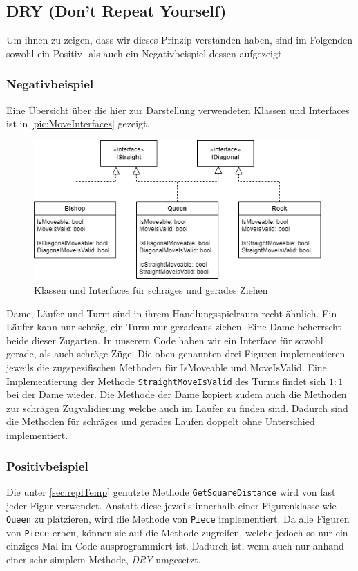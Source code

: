 \documentclass[
10pt, %
a4paper, %
oneside, %
headinclude,footinclude, %
BCOR5mm, %
]{scrartcl}
\begin{document}
\begin{onehalfspace}
\subsection{DRY (Don't Repeat Yourself)}
Um ihnen zu zeigen, dass wir dieses Prinzip verstanden haben, sind im Folgenden sowohl ein Positiv- als auch ein Negativbeispiel dessen aufgezeigt. 

\subsubsection{Negativbeispiel}
Eine Übersicht über die hier zur Darstellung verwendeten Klassen und Interfaces ist in \autoref{pic:MoveInterfaces} gezeigt.

\begin{figure}[h]
	\begin{center}
		\includegraphics[width=11cm]{MoveInterfaces.png}
		\caption{\label{pic:MoveInterfaces}Klassen und Interfaces für schräges und gerades Ziehen}
	\end{center}
\end{figure}

Dame, Läufer und Turm sind in ihrem Handlungsspielraum recht ähnlich. Ein Läufer kann nur schräg, ein Turm nur geradeaus ziehen. Eine Dame beherrscht beide dieser Zugarten. In unserem Code haben wir ein Interface für sowohl gerade, als auch schräge Züge. Die oben genannten drei Figuren implementieren jeweils die zugspezifischen Methoden für IsMoveable und MoveIsValid. 
Eine Implementierung der Methode \texttt{StraightMoveIsValid} des Turms findet sich $1:1$ bei der Dame wieder. Die Methode der Dame kopiert zudem auch die Methoden zur schrägen Zugvalidierung welche auch im Läufer zu finden sind. Dadurch sind die Methoden für schräges und gerades Laufen doppelt ohne Unterschied implementiert.

\subsubsection{Positivbeispiel}
Die unter \autoref{sec:replTemp} genutzte Methode \texttt{GetSquareDistance} wird von fast jeder Figur verwendet. Anstatt diese jeweils innerhalb einer Figurenklasse wie \texttt{Queen} zu platzieren, wird die Methode von \texttt{Piece} implementiert. Da alle Figuren von \texttt{Piece} erben, können sie auf die Methode zugreifen, welche jedoch so nur ein einziges Mal im Code ausprogrammiert ist. Dadurch ist, wenn auch nur anhand einer sehr simplem Methode, \textit{DRY} umgesetzt.
\newpage

\end{onehalfspace}
\end{document}
